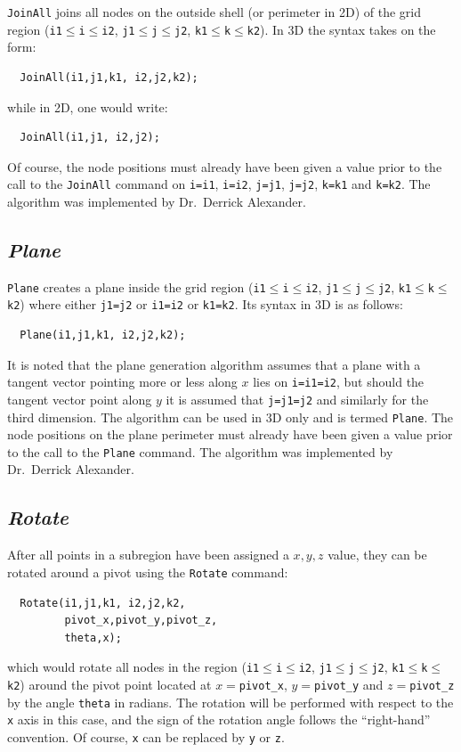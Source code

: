 \documentclass{warpdoc}
\begin{document}
\verb|JoinAll| joins all nodes on the outside shell (or perimeter in 2D) of the
grid region (\verb|i1|$\leq$\verb|i|$\leq$\verb|i2|,
  \verb|j1|$\leq$\verb|j|$\leq$\verb|j2|,
  \verb|k1|$\leq$\verb|k|$\leq$\verb|k2|). In 3D the syntax takes on the form:
%
\begin{verbatim}
  JoinAll(i1,j1,k1, i2,j2,k2);
\end{verbatim}
%
while in 2D, one would write:
%
\begin{verbatim}
  JoinAll(i1,j1, i2,j2);
\end{verbatim}
%
Of course, the node positions must already have been given a value prior
to the call to the \verb|JoinAll| command on
\verb|i=i1|, \verb|i=i2|, \verb|j=j1|, \verb|j=j2|, \verb|k=k1| and
\verb|k=k2|. The algorithm was implemented by Dr.\ Derrick Alexander.


\subsection{\emph{Plane}}

\verb|Plane| creates a plane inside the
grid region (\verb|i1|$\leq$\verb|i|$\leq$\verb|i2|,
  \verb|j1|$\leq$\verb|j|$\leq$\verb|j2|,
  \verb|k1|$\leq$\verb|k|$\leq$\verb|k2|) where either
  \verb|j1=j2| or \verb|i1=i2| or \verb|k1=k2|. Its syntax in 3D is as follows:
%
\begin{verbatim}
  Plane(i1,j1,k1, i2,j2,k2);
\end{verbatim}
%
It is noted that the plane generation algorithm  assumes that a plane
with a tangent vector pointing more or less along $x$ lies on \verb|i=i1=i2|, but
should the tangent vector point along $y$ it is assumed that \verb|j=j1=j2|
and similarly for the third dimension.
The algorithm can be used in 3D only and is termed \verb|Plane|. 
The node positions on the plane perimeter must already have been given a value prior
to the call to the \verb|Plane| command. The algorithm was 
implemented by Dr.\ Derrick Alexander.


\subsection{\emph{Rotate}}

After all points in a subregion have been assigned
a  $x,y,z$ value, they can be rotated around a pivot
using the \verb|Rotate| command:
%
\begin{verbatim}
  Rotate(i1,j1,k1, i2,j2,k2,
         pivot_x,pivot_y,pivot_z,
         theta,x);
\end{verbatim}
%
which would rotate all nodes in the region
(\verb|i1|$\leq$\verb|i|$\leq$\verb|i2|,
  \verb|j1|$\leq$\verb|j|$\leq$\verb|j2|,
  \verb|k1|$\leq$\verb|k|$\leq$\verb|k2|)
around the pivot point located at $x=$\verb|pivot_x|,
$y=$\verb|pivot_y| and $z=$\verb|pivot_z| by the angle
\verb|theta| in radians. The rotation will be performed with respect to
the \verb|x| axis in this case, and the sign of
the rotation angle follows the ``right-hand''
convention. Of course, \verb|x| can be replaced by
\verb|y| or \verb|z|.
\end{document}
